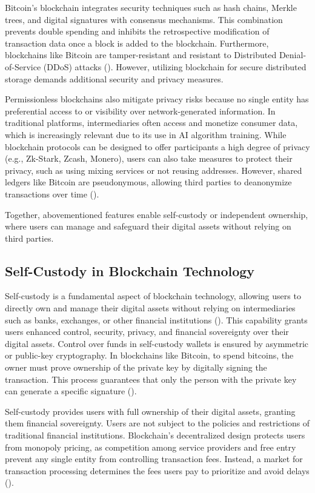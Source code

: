 \documentclass[twocolumn]{article}
\begin{document}
Bitcoin's blockchain integrates security techniques such as hash chains, Merkle trees, and digital signatures with consensus mechanisms. This combination prevents double spending and inhibits the retrospective modification of transaction data once a block is added to the blockchain. Furthermore, blockchains like Bitcoin are tamper-resistant and resistant to Distributed Denial-of-Service (DDoS) attacks (\cite{zhang_security_2020}). However, utilizing blockchain for secure distributed storage demands additional security and privacy measures.

Permissionless blockchains also mitigate privacy risks because no single entity has preferential access to or visibility over network-generated information. In traditional platforms, intermediaries often access and monetize consumer data, which is increasingly relevant due to its use in AI algorithm training. While blockchain protocols can be designed to offer participants a high degree of privacy (e.g., Zk-Stark, Zcash, Monero), users can also take measures to protect their privacy, such as using mixing services or not reusing addresses. However, shared ledgers like Bitcoin are pseudonymous, allowing third parties to deanonymize transactions over time (\cite{catalini_simple_2019}).

Together, abovementioned features enable self-custody or independent ownership, where users can manage and safeguard their digital assets without relying on third parties.

\subsection{Self-Custody in Blockchain Technology}
\label{subsec:sc}

Self-custody is a fundamental aspect of blockchain technology, allowing users to directly own and manage their digital assets without relying on intermediaries such as banks, exchanges, or other financial institutions (\cite{pimentel_systemizing_2021}). This capability grants users enhanced control, security, privacy, and financial sovereignty over their digital assets. Control over funds in self-custody wallets is ensured by asymmetric or public-key cryptography. In blockchains like Bitcoin, to spend bitcoins, the owner must prove ownership of the private key by digitally signing the transaction. This process guarantees that only the person with the private key can generate a specific signature (\cite{fernandez-carames_towards_2020}).

Self-custody provides users with full ownership of their digital assets, granting them financial sovereignty. Users are not subject to the policies and restrictions of traditional financial institutions. Blockchain's decentralized design protects users from monopoly pricing, as competition among service providers and free entry prevent any single entity from controlling transaction fees. Instead, a market for transaction processing determines the fees users pay to prioritize and avoid delays (\cite{huberman_monopoly_2021}).
\end{document}
